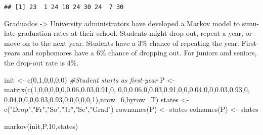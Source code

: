 \documentclass[
]{article}
\newenvironment{Shaded}{\begin{snugshade}}{\end{snugshade}}
\newcommand{\AttributeTok}[1]{\textcolor[rgb]{0.77,0.63,0.00}{#1}}
\newcommand{\CommentTok}[1]{\textcolor[rgb]{0.56,0.35,0.01}{\textit{#1}}}
\newcommand{\DecValTok}[1]{\textcolor[rgb]{0.00,0.00,0.81}{#1}}
\newcommand{\FloatTok}[1]{\textcolor[rgb]{0.00,0.00,0.81}{#1}}
\newcommand{\FunctionTok}[1]{\textcolor[rgb]{0.00,0.00,0.00}{#1}}
\newcommand{\NormalTok}[1]{#1}
\newcommand{\OtherTok}[1]{\textcolor[rgb]{0.56,0.35,0.01}{#1}}
\newcommand{\StringTok}[1]{\textcolor[rgb]{0.31,0.60,0.02}{#1}}
\begin{document}
\begin{verbatim}
## [1] 23  1 24 18 24 30 24  7 30
\end{verbatim}

Graduados -\textgreater{} University administrators have developed a
Markov model to simu- late graduation rates at their school. Students
might drop out, repeat a year, or move on to the next year. Students
have a 3\% chance of repeating the year. First-years and sophomores have
a 6\% chance of dropping out. For juniors and seniors, the drop-out rate
is 4\%.

\begin{Shaded}
\begin{Highlighting}[]
\NormalTok{init }\OtherTok{\textless{}{-}} \FunctionTok{c}\NormalTok{(}\DecValTok{0}\NormalTok{,}\DecValTok{1}\NormalTok{,}\DecValTok{0}\NormalTok{,}\DecValTok{0}\NormalTok{,}\DecValTok{0}\NormalTok{,}\DecValTok{0}\NormalTok{) }\CommentTok{\#Student starts as first{-}year}
\NormalTok{P }\OtherTok{\textless{}{-}} \FunctionTok{matrix}\NormalTok{(}\FunctionTok{c}\NormalTok{(}\DecValTok{1}\NormalTok{,}\DecValTok{0}\NormalTok{,}\DecValTok{0}\NormalTok{,}\DecValTok{0}\NormalTok{,}\DecValTok{0}\NormalTok{,}\DecValTok{0}\NormalTok{,}\FloatTok{0.06}\NormalTok{,}\FloatTok{0.03}\NormalTok{,}\FloatTok{0.91}\NormalTok{,}\DecValTok{0}\NormalTok{,}
\DecValTok{0}\NormalTok{,}\DecValTok{0}\NormalTok{,}\FloatTok{0.06}\NormalTok{,}\DecValTok{0}\NormalTok{,}\FloatTok{0.03}\NormalTok{,}\FloatTok{0.91}\NormalTok{,}\DecValTok{0}\NormalTok{,}\DecValTok{0}\NormalTok{,}\FloatTok{0.04}\NormalTok{,}\DecValTok{0}\NormalTok{,}\DecValTok{0}\NormalTok{,}\FloatTok{0.03}\NormalTok{,}\FloatTok{0.93}\NormalTok{,}\DecValTok{0}\NormalTok{,}
\FloatTok{0.04}\NormalTok{,}\DecValTok{0}\NormalTok{,}\DecValTok{0}\NormalTok{,}\DecValTok{0}\NormalTok{,}\FloatTok{0.03}\NormalTok{,}\FloatTok{0.93}\NormalTok{,}\DecValTok{0}\NormalTok{,}\DecValTok{0}\NormalTok{,}\DecValTok{0}\NormalTok{,}\DecValTok{0}\NormalTok{,}\DecValTok{0}\NormalTok{,}\DecValTok{1}\NormalTok{),}\AttributeTok{nrow=}\DecValTok{6}\NormalTok{,}\AttributeTok{byrow=}\NormalTok{T)}
\NormalTok{states }\OtherTok{\textless{}{-}}
\FunctionTok{c}\NormalTok{(}\StringTok{"Drop"}\NormalTok{,}\StringTok{"Fr"}\NormalTok{,}\StringTok{"So"}\NormalTok{,}\StringTok{"Jr"}\NormalTok{,}\StringTok{"Se"}\NormalTok{,}\StringTok{"Grad"}\NormalTok{)}
 \FunctionTok{rownames}\NormalTok{(P) }\OtherTok{\textless{}{-}}\NormalTok{ states}
 \FunctionTok{colnames}\NormalTok{(P) }\OtherTok{\textless{}{-}}\NormalTok{ states}

\FunctionTok{markov}\NormalTok{(init,P,}\DecValTok{10}\NormalTok{,states)}
\end{Highlighting}
\end{Shaded}
\end{document}
